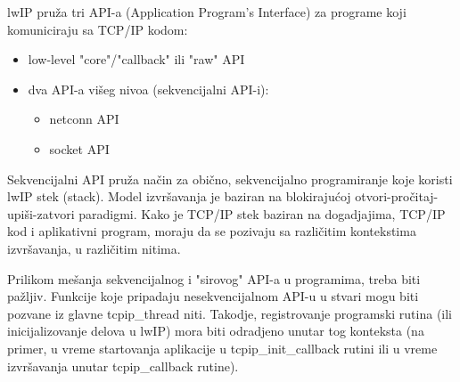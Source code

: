 \documentclass[a4paper,12pt, master]{etf}
\begin{document}
	lwIP pru\v{z}a tri API-a (Application Program's Interface) za programe koji
	komuniciraju sa	TCP/IP kodom:
	\begin{itemize}
		\item low-level "core"/"callback" ili "raw" API
		\item dva API-a vi\v{s}eg nivoa (sekvencijalni API-i):
			\begin{itemize}
				\item netconn API
				\item socket API
			\end{itemize}
	\end{itemize}

	Sekvencijalni API pru\v{z}a na\v{c}in za obi\v{c}no, sekvencijalno
	programiranje koje koristi lwIP stek (stack). Model izvr\v{s}avanja je
	baziran na blokiraju\'{c}oj	otvori-pro\v{c}itaj-upi\v{s}i-zatvori
	paradigmi. Kako je TCP/IP stek baziran na dogadjajima, TCP/IP kod i
	aplikativni program, moraju da se pozivaju sa razli\v{c}itim kontekstima
	izvr\v{s}avanja, u razli\v{c}itim nitima.

	Prilikom me\v{s}anja sekvencijalnog i "sirovog" API-a u programima, treba
	biti pa\v{z}ljiv. Funkcije koje pripadaju nesekvencijalnom API-u u stvari
	mogu biti pozvane iz glavne	tcpip\_thread niti.
	Takodje, registrovanje programski rutina (ili inicijalizovanje delova u
	lwIP) mora biti	odradjeno unutar tog konteksta (na primer, u vreme
	startovanja aplikacije u tcpip\_init\_callback rutini ili u vreme
	izvr\v{s}avanja unutar tcpip\_callback rutine).
\end{document}
